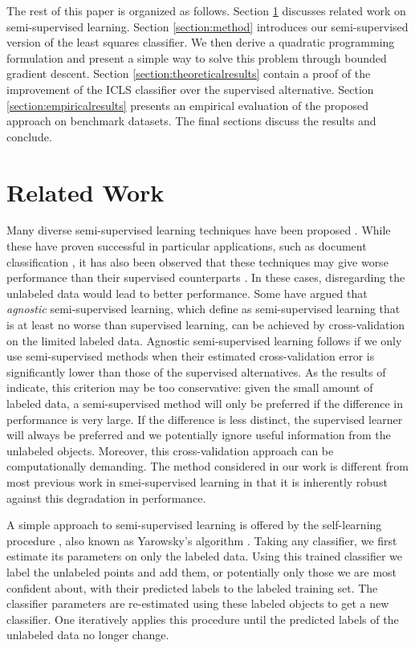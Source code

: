 \documentclass{elsarticle}
\begin{document}
The rest of this paper is organized as follows. 
Section \ref{section:relatedwork} discusses related work on semi-supervised learning. 
Section \ref{section:method} introduces our semi-supervised version of the least squares classifier. 
We then derive a quadratic programming formulation and present a simple way to solve this problem through bounded gradient descent. 
Section \ref{section:theoreticalresults} contain a proof of the improvement of the ICLS classifier over the supervised alternative. 
Section \ref{section:empiricalresults} presents an empirical evaluation of the proposed approach on benchmark datasets. The final sections discuss the results and conclude.

\section{Related Work} 
\label{section:relatedwork}
Many diverse semi-supervised learning techniques have been proposed \cite{Chapelle2006,Zhu2009}. 
While these have proven successful in  particular applications, such as document classification \cite{Nigam2000}, it has also been observed that these techniques may give worse performance than their supervised counterparts \cite{Cozman2003,Cozman2006}. 
In these cases, disregarding the unlabeled data would lead to better performance. 
Some \cite{Goldberg2009,Wang2007a} have argued that \emph{agnostic} semi-supervised learning, which \cite{Goldberg2009} define as semi-supervised learning that is at least no worse than supervised learning, can be achieved by cross-validation on the limited labeled data. 
Agnostic semi-supervised learning follows if we only use semi-supervised methods when their estimated cross-validation error is significantly lower than those of the supervised alternatives.
As the results of  \cite{Goldberg2009} indicate, this criterion may be too conservative: given the small amount of labeled data, a semi-supervised method will only be preferred if the difference in performance is very large. 
If the difference is less distinct, the supervised learner will always be preferred and we potentially ignore useful information from the unlabeled objects. 
Moreover, this cross-validation approach can be computationally demanding. 
The method considered in our work is different from most previous work in smei-supervised learning in that it is inherently robust against this degradation in performance.

A simple approach to semi-supervised learning is offered by the self-learning procedure \cite{McLachlan1975}, also known as Yarowsky's algorithm \cite{Yarowsky1995,Abney2004}. 
Taking any classifier, we first estimate its parameters on only  the labeled data. 
Using this trained classifier we label the unlabeled points and add them, or potentially only those we are most confident about, with their predicted labels to the labeled training set. 
The classifier parameters are re-estimated using these labeled objects to get a new classifier. 
One iteratively applies this procedure until the predicted labels of the unlabeled data no longer change.
\end{document}
